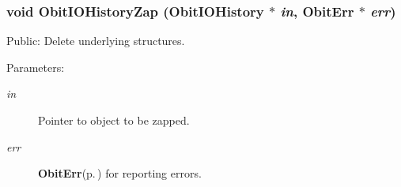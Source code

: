 \subsubsection{\setlength{\rightskip}{0pt plus 5cm}void Obit\-IOHistory\-Zap ({\bf Obit\-IOHistory} $\ast$ {\em in}, {\bf Obit\-Err} $\ast$ {\em err})}\label{ObitIOHistory_8h_a10}


Public: Delete underlying structures. 

\begin{Desc}
\item[Parameters:]
\begin{description}
\item[{\em in}]Pointer to object to be zapped. \item[{\em err}]{\bf Obit\-Err}{\rm (p.\,\pageref{structObitErr})} for reporting errors. \end{description}
\end{Desc}

